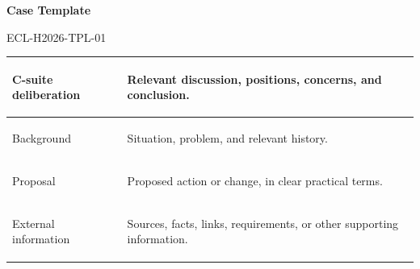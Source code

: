 \documentclass{../../../Common/Latex/Templates/rapport}
\date{\today}
\begin{document}
\reportmainmatter
\small
\setlength{\parindent}{0pt}
\setlength{\tabcolsep}{6pt}
\renewcommand{\arraystretch}{1.2}

\begin{center}
  {\Large\bfseries Case Template}\par
  \vspace{0.15cm}
  {\normalsize ECL-H2026-TPL-01}\par
\end{center}

\vspace{0.3cm}
\begin{tabularx}{\textwidth}{|>{\bfseries\raggedright\arraybackslash}p{4.2cm}|X|}
  \hline
  C-suite deliberation & \rule{0pt}{4.1cm}Relevant discussion, positions, concerns, and conclusion.             \\
  \hline
  Background           & \rule{0pt}{4.1cm}Situation, problem, and relevant history.                             \\
  \hline
  Proposal             & \rule{0pt}{4.1cm}Proposed action or change, in clear practical terms.                  \\
  \hline
  External information & \rule{0pt}{4.1cm}Sources, facts, links, requirements, or other supporting information. \\
  \hline
\end{tabularx}
\end{document}
